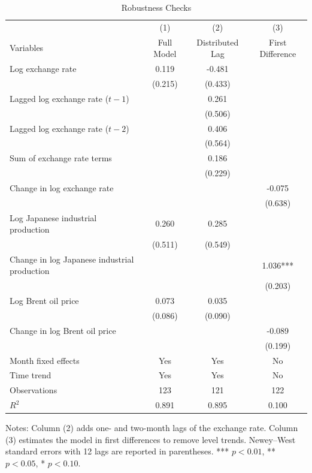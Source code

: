 \begin{table}[H]
\centering
\caption{Robustness Checks}
\label{tab:robust}
\begin{threeparttable}
\begin{tabular}{lccc}
\toprule
 & (1) & (2) & (3) \\
Variables & Full Model & Distributed Lag & First Difference \\
\midrule
Log exchange rate & 0.119 & -0.481 &  \\
 & (0.215) & (0.433) &  \\
Lagged log exchange rate ($t-1$) &  & 0.261 &  \\
 &  & (0.506) &  \\
Lagged log exchange rate ($t-2$) &  & 0.406 &  \\
 &  & (0.564) &  \\
Sum of exchange rate terms &  & 0.186 &  \\
 &  & (0.229) &  \\
Change in log exchange rate &  &  & -0.075 \\
 &  &  & (0.638) \\
Log Japanese industrial production & 0.260 & 0.285 &  \\
 & (0.511) & (0.549) &  \\
Change in log Japanese industrial production &  &  & 1.036*** \\
 &  &  & (0.203) \\
Log Brent oil price & 0.073 & 0.035 &  \\
 & (0.086) & (0.090) &  \\
Change in log Brent oil price &  &  & -0.089 \\
 &  &  & (0.199) \\
\midrule
Month fixed effects & Yes & Yes & No \\
Time trend & Yes & Yes & No \\
Observations & 123 & 121 & 122 \\
$R^2$ & 0.891 & 0.895 & 0.100 \\
\bottomrule
\end{tabular}
\begin{tablenotes}[flushleft]
\footnotesize \item Notes: Column (2) adds one- and two-month lags of the exchange rate. Column (3) estimates the model in first differences to remove level trends. Newey--West standard errors with 12 lags are reported in parentheses. *** $p<0.01$, ** $p<0.05$, * $p<0.10$.
\end{tablenotes}
\end{threeparttable}
\end{table}

